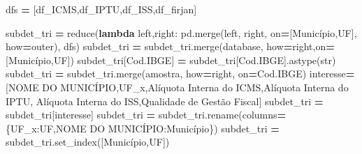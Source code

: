 \documentclass[
  12,
  dvipsnames]{article}
\newenvironment{Shaded}{\begin{snugshade}}{\end{snugshade}}
\newcommand{\BuiltInTok}[1]{#1}
\newcommand{\KeywordTok}[1]{\textcolor[rgb]{0.13,0.29,0.53}{\textbf{#1}}}
\newcommand{\NormalTok}[1]{#1}
\newcommand{\OperatorTok}[1]{\textcolor[rgb]{0.81,0.36,0.00}{\textbf{#1}}}
\newcommand{\StringTok}[1]{\textcolor[rgb]{0.31,0.60,0.02}{#1}}
\begin{document}
\begin{Shaded}
\begin{Highlighting}[]
\NormalTok{dfs }\OperatorTok{=}\NormalTok{ [df\_ICMS,df\_IPTU,df\_ISS,df\_firjan]}

\NormalTok{subdet\_tri }\OperatorTok{=} \BuiltInTok{reduce}\NormalTok{(}\KeywordTok{lambda}\NormalTok{ left,right: pd.merge(left, right, on}\OperatorTok{=}\NormalTok{[}\StringTok{\textquotesingle{}Município\textquotesingle{}}\NormalTok{,}\StringTok{\textquotesingle{}UF\textquotesingle{}}\NormalTok{], }
\NormalTok{                                                how}\OperatorTok{=}\StringTok{\textquotesingle{}outer\textquotesingle{}}\NormalTok{), dfs)}
\NormalTok{subdet\_tri }\OperatorTok{=}\NormalTok{ subdet\_tri.merge(database, how}\OperatorTok{=}\StringTok{\textquotesingle{}right\textquotesingle{}}\NormalTok{,on}\OperatorTok{=}\NormalTok{[}\StringTok{\textquotesingle{}Município\textquotesingle{}}\NormalTok{,}\StringTok{\textquotesingle{}UF\textquotesingle{}}\NormalTok{])}
\NormalTok{subdet\_tri[}\StringTok{\textquotesingle{}Cod.IBGE\textquotesingle{}}\NormalTok{] }\OperatorTok{=}\NormalTok{ subdet\_tri[}\StringTok{\textquotesingle{}Cod.IBGE\textquotesingle{}}\NormalTok{].astype(}\BuiltInTok{str}\NormalTok{)}
\NormalTok{subdet\_tri }\OperatorTok{=}\NormalTok{ subdet\_tri.merge(amostra, how}\OperatorTok{=}\StringTok{\textquotesingle{}right\textquotesingle{}}\NormalTok{, on}\OperatorTok{=}\StringTok{\textquotesingle{}Cod.IBGE\textquotesingle{}}\NormalTok{)}
\NormalTok{interesse}\OperatorTok{=}\NormalTok{[}\StringTok{\textquotesingle{}NOME DO MUNICÍPIO\textquotesingle{}}\NormalTok{,}\StringTok{\textquotesingle{}UF\_x\textquotesingle{}}\NormalTok{,}\StringTok{\textquotesingle{}Alíquota Interna do ICMS\textquotesingle{}}\NormalTok{,}\StringTok{\textquotesingle{}Alíquota Interna do IPTU\textquotesingle{}}\NormalTok{,}
           \StringTok{\textquotesingle{}Alíquota Interna do ISS\textquotesingle{}}\NormalTok{,}\StringTok{\textquotesingle{}Qualidade de Gestão Fiscal\textquotesingle{}}\NormalTok{]}
\NormalTok{subdet\_tri }\OperatorTok{=}\NormalTok{ subdet\_tri[interesse]}
\NormalTok{subdet\_tri }\OperatorTok{=}\NormalTok{ subdet\_tri.rename(columns}\OperatorTok{=}\NormalTok{\{}\StringTok{\textquotesingle{}UF\_x\textquotesingle{}}\NormalTok{:}\StringTok{\textquotesingle{}UF\textquotesingle{}}\NormalTok{,}\StringTok{\textquotesingle{}NOME DO MUNICÍPIO\textquotesingle{}}\NormalTok{:}\StringTok{\textquotesingle{}Município\textquotesingle{}}\NormalTok{\})}
\NormalTok{subdet\_tri }\OperatorTok{=}\NormalTok{ subdet\_tri.set\_index([}\StringTok{\textquotesingle{}Município\textquotesingle{}}\NormalTok{,}\StringTok{\textquotesingle{}UF\textquotesingle{}}\NormalTok{])}


\end{Highlighting}
\end{Shaded}
\end{document}
